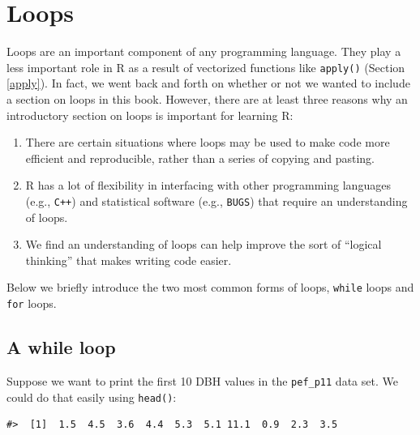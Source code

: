 \documentclass[
  11pt,
]{krantz}
\newenvironment{Shaded}{\begin{snugshade}}{\end{snugshade}}
\newcommand{\DecValTok}[1]{\textcolor[rgb]{0.00,0.00,0.81}{#1}}
\newcommand{\KeywordTok}[1]{\textcolor[rgb]{0.13,0.29,0.53}{\textbf{#1}}}
\newcommand{\NormalTok}[1]{#1}
\newcommand{\OperatorTok}[1]{\textcolor[rgb]{0.81,0.36,0.00}{\textbf{#1}}}
\providecommand{\tightlist}{%
  \setlength{\itemsep}{0pt}\setlength{\parskip}{0pt}}
\theoremstyle{definition}
\theoremstyle{definition}
\theoremstyle{definition}
\theoremstyle{definition}
\theoremstyle{remark}
\begin{document}
\hypertarget{loops}{%
\section{Loops}\label{loops}}

Loops are an important component of any programming language. They play a less important role in R as a result of vectorized functions like \texttt{apply()} (Section \ref{apply}). In fact, we went back and forth on whether or not we wanted to include a section on loops in this book. However, there are at least three reasons why an introductory section on loops is important for learning R:

\begin{enumerate}
\def\labelenumi{\arabic{enumi}.}
\tightlist
\item
  There are certain situations where loops may be used to make code more efficient and reproducible, rather than a series of copying and pasting.
\item
  R has a lot of flexibility in interfacing with other programming languages (e.g., \texttt{C++}) and statistical software (e.g., \texttt{BUGS}) that require an understanding of loops.
\item
  We find an understanding of loops can help improve the sort of ``logical thinking'' that makes writing code easier.
\end{enumerate}

Below we briefly introduce the two most common forms of loops, \texttt{while} loops and \texttt{for} loops.

\hypertarget{a-while-loop}{%
\subsection{A while loop}\label{a-while-loop}}

Suppose we want to print the first 10 DBH values in the \texttt{pef\_p11} data set. We could do that easily using \texttt{head()}:

\begin{Shaded}
\end{Shaded}

\begin{verbatim}
#>  [1]  1.5  4.5  3.6  4.4  5.3  5.1 11.1  0.9  2.3  3.5
\end{verbatim}
\end{document}
